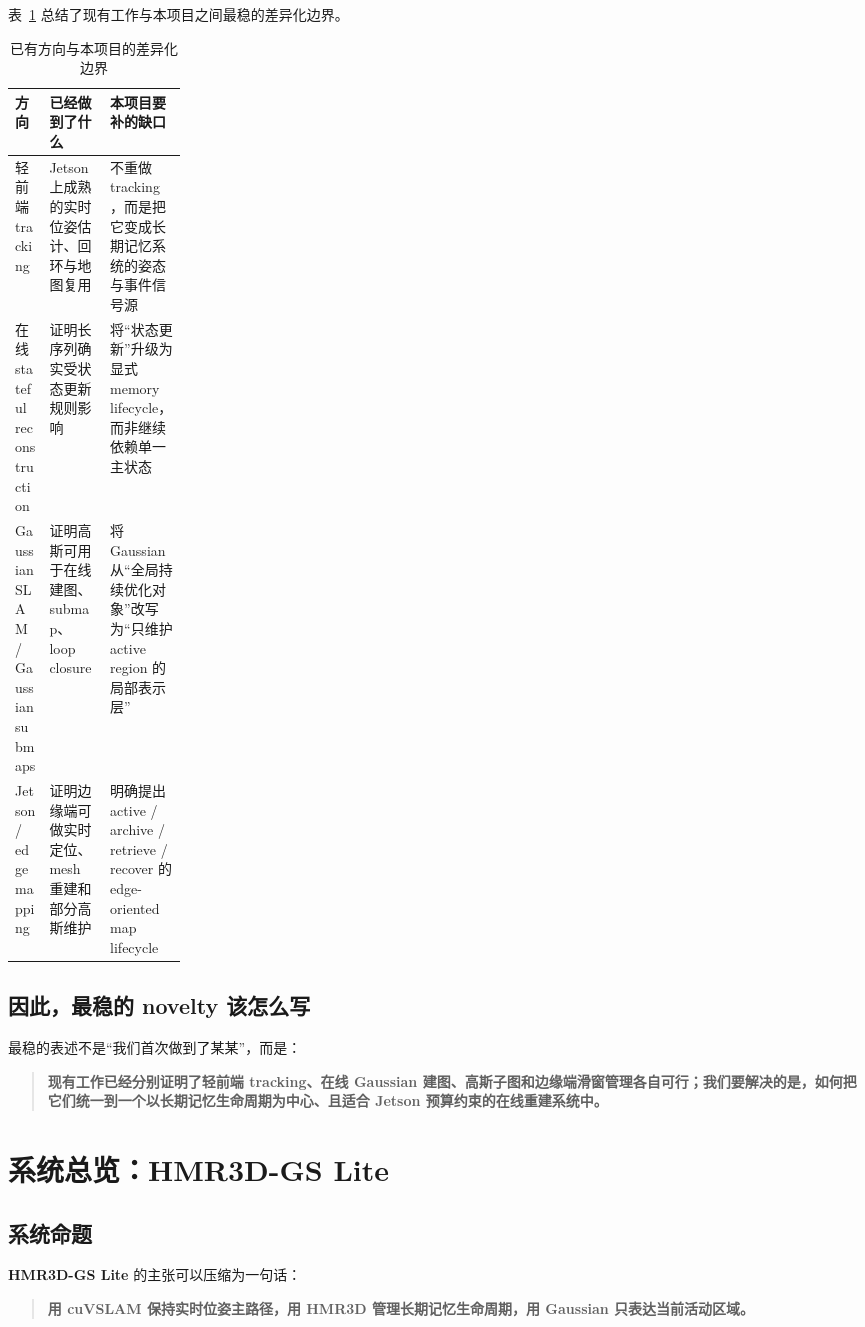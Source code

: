 \documentclass[12pt]{article}
\newcommand{\system}{\textbf{HMR3D-GS Lite}}
\newcommand{\hmr}{\textbf{HMR3D}}
\newcommand{\cuvslam}{\textbf{cuVSLAM}}
\begin{document}
表~\ref{tab:diff-summary} 总结了现有工作与本项目之间最稳的差异化边界。

\begin{table}[H]
\centering
\caption{已有方向与本项目的差异化边界}
\label{tab:diff-summary}
\begin{tabularx}{\linewidth}{>{\raggedright\arraybackslash}p{0.2\linewidth} >{\raggedright\arraybackslash}X >{\raggedright\arraybackslash}X}
\toprule
方向 & 已经做到了什么 & 本项目要补的缺口 \\
\midrule
轻前端 tracking & Jetson 上成熟的实时位姿估计、回环与地图复用 & 不重做 tracking，而是把它变成长期记忆系统的姿态与事件信号源 \\
在线 stateful reconstruction & 证明长序列确实受状态更新规则影响 & 将“状态更新”升级为显式 memory lifecycle，而非继续依赖单一主状态 \\
Gaussian SLAM / Gaussian submaps & 证明高斯可用于在线建图、submap、loop closure & 将 Gaussian 从“全局持续优化对象”改写为“只维护 active region 的局部表示层” \\
Jetson / edge mapping & 证明边缘端可做实时定位、mesh 重建和部分高斯维护 & 明确提出 active / archive / retrieve / recover 的 edge-oriented map lifecycle \\
\bottomrule
\end{tabularx}
\end{table}

\subsection{因此，最稳的 novelty 该怎么写}

最稳的表述不是“我们首次做到了某某”，而是：
\begin{quote}
\textbf{现有工作已经分别证明了轻前端 tracking、在线 Gaussian 建图、高斯子图和边缘端滑窗管理各自可行；我们要解决的是，如何把它们统一到一个以长期记忆生命周期为中心、且适合 Jetson 预算约束的在线重建系统中。}
\end{quote}

\section{系统总览：\system{}}

\subsection{系统命题}

\system{} 的主张可以压缩为一句话：
\begin{quote}
\textbf{用 \cuvslam{} 保持实时位姿主路径，用 \hmr{} 管理长期记忆生命周期，用 Gaussian 只表达当前活动区域。}
\end{quote}
\end{document}
